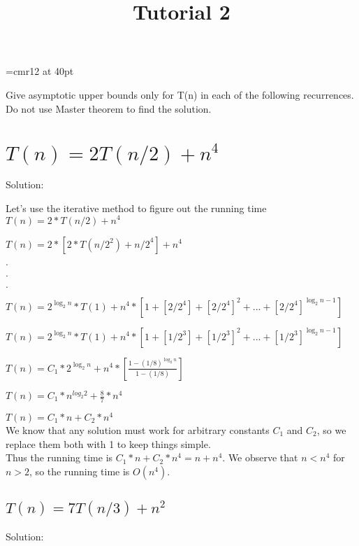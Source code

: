 \documentclass[18 pt]{article}
\begin{document}
\begin{huge}
\font\myfont=cmr12 at 40pt
\title{Tutorial 2}
\author{}
\date{}
\maketitle
\end{huge}
\begin{flushleft}

\begin{Large}
Give asymptotic upper bounds only for T(n) in each of the following recurrences. Do not use Master theorem to find the solution. 
\end{Large}
\section{$T(n) = 2T(n/2) + n^4$}
\Large Solution:
\end{flushleft}

Let's use the iterative method to figure out the running time \\

$T(n) = 2*T(n/2) + n^4$

$T(n) = 2*[2*T(n/{2^2})+{n/2}^4] + n^4 $

$.$

$.$

$.$

$T(n) = 2^{\log_2{n}}*T(1) + n^4*[1+[2/{2^4}]+[2/{2^4}]^2+...+[2/{2^4}]^{\log_2{n}-1} ]$

$T(n) = 2^{\log_2{n}}*T(1) + n^4*[1+[1/{2^3}]+[1/{2^3}]^2+...+[1/{2^3}]^{\log_2{n}-1} ]$

$T(n)= C_1 * 2^{\log_2{n}} + n^4 * \left[ \frac{1-(1/8)^{\log_2{n}}}{1-(1/8)} \right]$

$T(n) = C_1*n^{log_2{2}} + \frac{8}{7}*n^4$

$T(n) = C_1*n + C_2*n^4$\\

We know that any solution must work for arbitrary constants $C_1$ and $C_2$, so we replace them both with 1 to keep things simple. \\

Thus the running time is $C_1*n + C_2*n^4= n + n^4$. We observe that $ n < n^4$ for $n>2$, so the running time is $O(n^4)$.


\begin{flushleft}
\section{$T(n) = 7T(n/3) + n^2$}
\Large Solution:
\end{flushleft}
\end{document}

